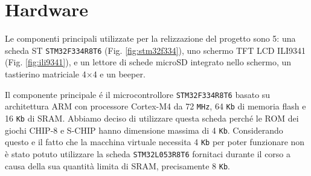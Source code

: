 \documentclass[a4paper]{article}
\begin{document}
\section{Hardware}\label{sec:hardware}

Le componenti principali utilizzate per la relizzazione del progetto sono 5:
una scheda ST \texttt{STM32F334R8T6} (Fig. \ref{fig:stm32f334}), uno schermo
TFT LCD ILI9341 (Fig. \ref{fig:ili9341}), e un lettore di schede microSD
integrato nello schermo, un tastierino matriciale 4$\times$4 e un beeper.

Il componente principale é il microcontrollore \texttt{STM32F334R8T6} basato su
architettura ARM con processore Cortex-M4 da 72 \texttt{MHz}, 64 \texttt{Kb} di
memoria flash e 16 \texttt{Kb} di SRAM. Abbiamo deciso di utilizzare questa
scheda perché le ROM dei giochi CHIP-8 e S-CHIP hanno dimensione massima di 4
\texttt{Kb}. Considerando questo e il fatto che la macchina virtuale necessita
4 \texttt{Kb} per poter funzionare non è stato potuto utilizzare la scheda
\texttt{STM32L053R8T6} fornitaci durante il corso a causa della sua quantità
limita di SRAM, precisamente 8 \texttt{Kb}.
\end{document}
